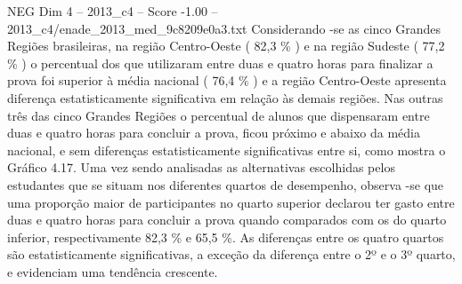 \begin{textsample}{NEG Dim 4 – 2013\_c4 – Score -1.00 – 2013\_c4/enade\_2013\_med\_9c8209e0a3.txt}
Considerando -se as cinco Grandes Regiões brasileiras, na região Centro-Oeste ( 82,3 \% ) e na região Sudeste ( 77,2 \% ) o percentual dos que utilizaram entre duas e quatro horas para finalizar a prova foi superior à média nacional ( 76,4 \% ) e a região Centro-Oeste apresenta diferença estatisticamente significativa em relação às demais regiões.
Nas outras três das cinco Grandes Regiões o percentual de alunos que dispensaram entre duas e quatro horas para concluir a prova, ficou próximo e abaixo da média nacional, e sem diferenças estatisticamente significativas entre si, como mostra o Gráfico 4.17.
Uma vez sendo analisadas as alternativas escolhidas pelos estudantes que se situam nos diferentes quartos de desempenho, observa -se que uma proporção maior de participantes no quarto superior declarou ter gasto entre duas e quatro horas para concluir a prova quando comparados com os do quarto inferior, respectivamente 82,3 \% e 65,5 \%.
As diferenças entre os quatro quartos são estatisticamente significativas, a exceção da diferença entre o 2º e o 3º quarto, e evidenciam uma tendência crescente.

\end{textsample}
